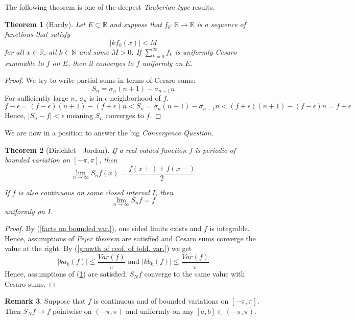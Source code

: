 \documentclass[12pt]{amsart}
\newtheorem{theorem}{Theorem}[section]
\theoremstyle{definition}
\newtheorem{remark}[theorem]{Remark}
\newcommand{\NN}{{\mathbb N}} %
\newcommand{\RR}{{\mathbb R}} %
\begin{document}
The following theorem is one of the deepest \emph{Tauberian type} results.


\begin{theorem}[Hardy]\label{Hardy}
    Let $E \subset \RR$ and suppose that $f_k: \RR \to \RR$ is a sequence of functions that satisfy
    \[
    |kf_k(x)| < M
    \]
    for all $x \in \RR$, all $k \in \NN$ and some $M > 0$. If $\sum_{k=0}^{\infty}f_k$ is uniformly Cesaro summable to $f$ on $E$,
    then it converges to $f$ uniformly on $E$.
\end{theorem}


\begin{proof}




    We try to write partial sums in terms of Cesaro sums:
    \[
    S_n = \sigma_n (n+1) - \sigma_{n-1} n
    \]
    For sufficiently large $n$, $\sigma_n$ is in $\epsilon$-neighborhood of $f$.
    \[
  f - \epsilon = (f-\epsilon)(n+1) -  (f+\epsilon)n < S_n = \sigma_n (n+1) - \sigma_{n-1} n < (f+\epsilon)(n+1) -  (f-\epsilon)n =  f + \epsilon
    \]
    Hence, $|S_n - f| < \epsilon$ meaning $S_n$ converges to $f$.
\end{proof}


We are now in a position to answer the big \emph{Convergence Question.}

\begin{theorem}[Dirichlet - Jordan]\label{Dirichlet - Jordan}
    If a real valued function $f$ is periodic of bounded variation on $[-\pi,\pi]$, then
    \[
    \lim_{n \to \infty}S_nf(x) = \frac{f(x+) + f(x-)}{2}
    \]

    If $f$ is also continuous on some closed interval $I$, then
    \[
    \lim_{n \to \infty}S_nf = f
    \]
    uniformly on $I$.
\end{theorem}


\begin{proof}
    By (\ref{facts on bounded var.}), one sided limits exists and $f$ is integrable. Hence, assumptions of \emph{Fejer theorem} are satisfied and Cesaro sums converge the value at the right. By (\ref{growth of ceof. of bdd. var.}) we get
    \[
    |ka_k(f)|\leq \frac{Var(f)}{\pi}  \text{ and }  |kb_k(f)| \leq \frac{Var(f)}{\pi}
    \]
    Hence, assumptions of (\ref{Hardy}) are satisfied. $S_Nf$ converge to the same value with Cesaro sums.
\end{proof}



\begin{remark}
    Suppose that $f$ is continuous and of bounded variations on $[-\pi,\pi]$. Then $S_Nf \to f$ pointwise on $(-\pi,\pi)$ and uniformly on any $[a,b] \subset (-\pi,\pi)$.
\end{remark}
\end{document}
